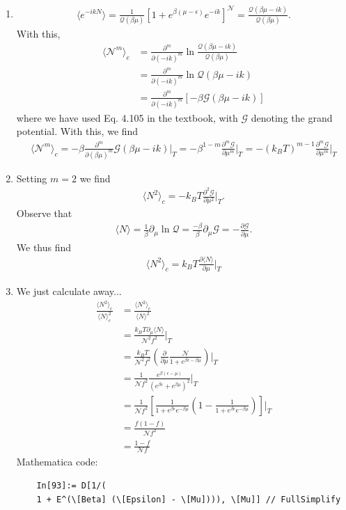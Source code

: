 \documentclass{article}
\theoremstyle{definition}
\newcommand{\p}{\partial}
\newcommand{\be}{\beta}
\newcommand{\f}[2]{\frac{#1}{#2}}
\newcommand{\lp}{\left(}
\newcommand{\rp}{\right)}
\newcommand{\lb}{\left[}
\newcommand{\rb}{\right]}
\begin{document}
\begin{enumerate}[label=(\alph*)]
	
	
	\item 
	\begin{align*}
	\langle e^{-ikN} \rangle = \f{1}{\mathcal{Q}(\be\mu)}\lb 1 + e^{\be(\mu - \epsilon)} e^{-ik} \rb^\mathcal{N}  = \f{\mathcal{Q}(\be\mu - ik)}{\mathcal{Q}(\be\mu)}.
	\end{align*}
	With this, 
	\begin{align*}
	\langle \mathcal{N}^m \rangle_c &= \f{\p^m}{\p (-ik)^m} \ln \f{\mathcal{Q}(\be\mu - ik)}{\mathcal{Q}(\be\mu)}\\
	&= \f{\p^m}{\p (-ik)^m} \ln {\mathcal{Q}(\be\mu - ik)}\\
	&= \f{\p^m}{\p (-ik)^m} \lb -\be \mathcal{G}(\be\mu - ik)\rb
	\end{align*}
	where we have used Eq. 4.105 in the textbook, with $\mathcal{G}$ denoting the grand potential. With this, we find 
	\begin{align*}
	\langle \mathcal{N}^m \rangle_c 
	= -\be \f{\p^m}{\p (\be\mu)^m}\mathcal{G}(\be\mu - ik)\bigg\vert_T 
	= -\be^{1-m} \f{\p^m \mathcal{G}}{\p \mu^m}\bigg\vert_T 
	= \boxed{-(k_BT)^{m-1}\f{\p^m \mathcal{G}}{\p \mu^m} \bigg\vert_T}
	\end{align*}
	
	\item Setting $m=2$ we find 
	\begin{align*}
	\langle N^2 \rangle_c = -k_BT \f{\p^2 \mathcal{G}}{\p \mu^2}\bigg\vert_T.
	\end{align*}
	Observe that 
	\begin{align*}
	\langle N\rangle = \f{1}{\be}\p_\mu \ln \mathcal{Q} = \f{-\be}{\be}\p_\mu \mathcal{G} = -\f{\p \mathcal{G}}{\p \mu}.
	\end{align*}
	We thus find 
	\begin{align*}
	\boxed{\langle N^2\rangle_c = k_BT \f{\p \langle N \rangle }{\p \mu}\bigg\vert_T}
	\end{align*}
	
	\item We just calculate away...
	\begin{align*}
	\f{\langle N^2\rangle_c}{\langle N\rangle_c^2} 
	&= \f{\langle N^2\rangle_c}{\langle N\rangle^2} \\
	&= \f{k_BT \p_\mu \langle N \rangle}{\mathcal{N}^2 f^2}\bigg\vert_T \\
	&= \f{k_BT}{\mathcal{N}^2 f^2}\lp  \f{\p}{\p \mu} \f{\mathcal{N}}{1 + e^{\be\epsilon - \be\mu} }\rp \bigg\vert_T\\
	&= \f{1}{\mathcal{N} f^2} \f{e^{\be(\epsilon-\mu)}}{(e^{\be\epsilon} + e^{\be\mu})^2}\bigg\vert_T \\
	&= \f{1}{\mathcal{N}f^2} \lb \f{1}{1 + e^{\be\epsilon}e^{-\be\mu}} \lp 1- \f{1}{1 + e^{\be\epsilon}e^{-\be\mu}} \rp \rb\bigg\vert_T \\
	&= \f{f(1-f)}{\mathcal{N} f^2} \\
	&= \boxed{\f{1-f}{\mathcal{N}f}}
	\end{align*}
 	Mathematica code:
 	\begin{lstlisting}
 	In[93]:= D[1/(
 	1 + E^(\[Beta] (\[Epsilon] - \[Mu]))), \[Mu]] // FullSimplify
 	

\end{lstlisting}
\end{enumerate}
\end{document}
